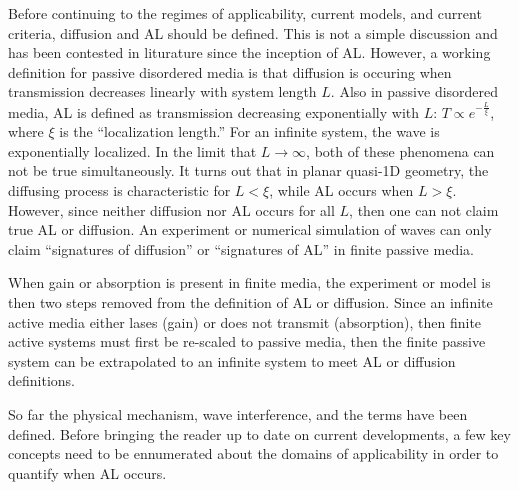 
Before continuing to the regimes of applicability, current models, and current criteria, diffusion and AL should be defined. This is not a simple discussion and has been contested in liturature since the inception of AL. However, a working definition for passive disordered media is that diffusion is occuring when transmission decreases linearly with system length $L$. Also in passive disordered media, AL is defined as transmission decreasing exponentially with $L$: $T \propto e^{-\frac{L}{\xi}}$, where $\xi$ is the ``localization length.'' For an infinite system, the wave is exponentially localized. In the limit that $L \rightarrow \infty$, both of these phenomena can not be true simultaneously. It turns out that in planar quasi-1D geometry, the diffusing process is characteristic for $L<\xi$, while AL occurs when $L>\xi$. However, since neither diffusion nor AL occurs for all $L$, then one can not claim true AL or diffusion. An experiment or numerical simulation of waves can only claim ``signatures of diffusion'' or ``signatures of AL'' in finite passive media.

When gain or absorption is present in finite media, the experiment or model is then two steps removed from the definition of AL or diffusion. Since an infinite active media either lases (gain) or does not transmit (absorption), then finite active systems must first be re-scaled to passive media, then the finite passive system can be extrapolated to an infinite system to meet AL or diffusion definitions.

So far the physical mechanism, wave interference, and the terms have been defined. Before bringing the reader up to date on current developments, a few key concepts need to be ennumerated about the domains of applicability in order to quantify when AL occurs.

